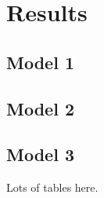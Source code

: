 \section{Results}

\subsection{Model 1}

\subsection{Model 2}

\subsection{Model 3}

Lots of tables here.